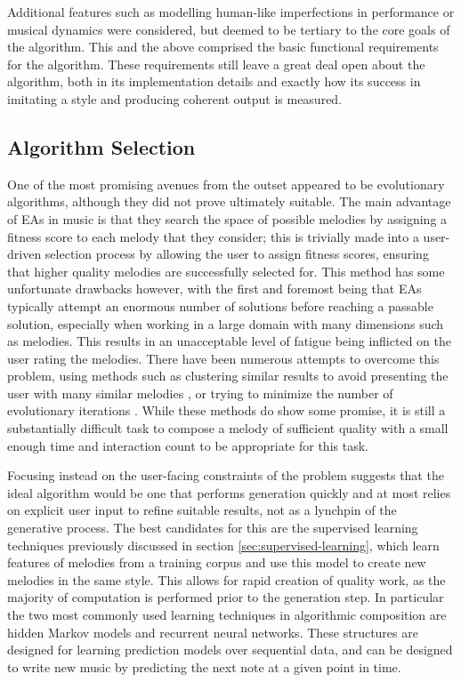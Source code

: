 \documentclass[ author={Stephen Livermore-Tozer},
				supervisor={Dr. Peter Flach},
				degree={MEng},
				title={Algorithmic Co-composition Using Machine Learning},
				subtitle={},
				type={research},
				year={2016} ]{dissertation}
\begin{document}
	Additional features such as modelling human-like imperfections in performance or musical dynamics were considered, but deemed to be tertiary to the core goals of the algorithm. This and the above comprised the basic functional requirements for the algorithm. These requirements still leave a great deal 
	open about the algorithm, both in its implementation details and exactly how its success in imitating a style and producing coherent output is measured.

	\subsection{Algorithm Selection}
	\label{sec:algorithm-selection}
	
	One of the most promising avenues from the outset appeared to be evolutionary algorithms, although they did not prove ultimately suitable. The main advantage of EAs in music is that they search the space of possible melodies by assigning a fitness score to each melody that they consider; this is trivially made into a user-driven selection process by allowing the user to assign fitness scores, ensuring that higher quality melodies are successfully selected for. This method has some unfortunate drawbacks however, with the first and foremost being that EAs typically attempt an enormous number of solutions before reaching a passable solution, especially when working in a large domain with many dimensions such as melodies. This results in an unacceptable level of fatigue being inflicted on the user rating the melodies. There have been numerous attempts to overcome this problem, using methods such as clustering similar results to avoid presenting the user with many similar melodies \cite{burton1998hybrid,ralley1995genetic}, or trying to minimize the number of evolutionary iterations \cite{marques2010interactive}. While these methods do show some promise, it is still a substantially difficult task to compose a melody of sufficient quality with a small enough time and interaction count to be appropriate for this task.

	Focusing instead on the user-facing constraints of the problem suggests that the ideal algorithm would be one that performs generation quickly and at most relies on explicit user input to refine suitable results, not as a lynchpin of the generative process. The best candidates for this are the supervised learning techniques previously discussed in section \ref{sec:supervised-learning}, which learn features of melodies from a training corpus and use this model to create new melodies in the same style. This allows for rapid creation of quality work, as the majority of computation is performed prior to the generation step. In particular the two most commonly used learning techniques in algorithmic composition are hidden Markov models and recurrent neural networks. These structures are designed for learning prediction models over sequential data, and can be designed to write new music by predicting the next note at a given point in time. 
	
\end{document}
